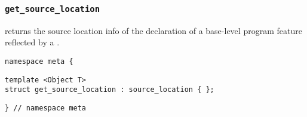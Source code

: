 
\subsubsection{\texttt{get\_source\_location}}

returns the source location info of the declaration of a base-level program feature reflected by a .

\begin{verbatim}
namespace meta {
\end{verbatim}
\begin{verbatim}
template <Object T>
struct get_source_location : source_location { };

\end{verbatim}
\begin{verbatim}
} // namespace meta
\end{verbatim}
